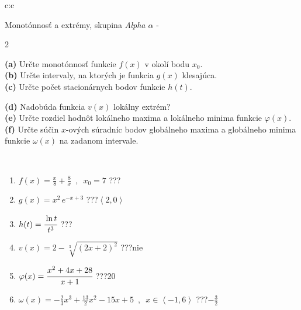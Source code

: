 \documentclass[10pt]{report}
\begin{document}
\thispagestyle{empty}
\begin{tabular}{c:c}
\begin{minipage}[c][104.5mm][t]{0.5\linewidth}
\begin{center}
\vspace{7mm}
{\huge Monotónnosť a extrémy, skupina \textit{Alpha $\alpha$} -}\\[5mm]
\begin{minipage}{0.95\linewidth}
\begin{center}
{\small \begin{multicols}{2} \raggedright
\textbf{(a)} Určte monotónnosť funkcie \(f(x)\) v okolí bodu \(x_0\). \\[1mm]
\textbf{(b)} Určte intervaly, na ktorých je funkcia \(g(x)\) klesajúca. \\[1mm]
\textbf{(c)} Určte počet stacionárnych bodov funkcie \(h(t)\). \par \columnbreak
\textbf{(d)} Nadobúda funkcia \(v(x)\) lokálny extrém? \\[1mm]
\textbf{(e)} Určte rozdiel hodnôt lokálneho maxima a lokálneho minima funkcie \(\varphi(x)\). \\[1mm]
\textbf{(f)} Určte súčin \(x\)-ových súradníc bodov globálneho maxima a globálneho minima funkcie \(\omega(x)\) na zadanom intervale. \\[1mm]
\end{multicols}
}
\end{center}
\end{minipage}
\\[4mm]
\begin{minipage}{0.79\linewidth}
\begin{center}
\begin{varwidth}{\linewidth}
\begin{enumerate}
\normalsize
\item $f(x)=\frac{x}{8}+\frac{8}{x} \enspace , \enspace x_0=7$\quad \dotfill\; ???\;\dotfill \quad {}
\item $g(x)=x^2\, e^{-x+3}$\quad \dotfill\; ???\;\dotfill \quad $\left\langle2 , 0\right\rangle$
\item $h(t)=\cfrac{\ln t}{t^3}$\quad \dotfill\; ???\;\dotfill {}
\item $v(x)=2-\sqrt[3]{(2x+2)^2}$\quad \dotfill\; ???\;\dotfill \quad $\text{nie}$
\item $\varphi(x)=\cfrac{x^2+4x+28}{x+1}$\quad \dotfill\; ???\;\dotfill \quad $20$
\item $\omega(x)=-\frac{2}{3}x^3+\frac{13}{2}x^2-15x+5 \enspace , \enspace x\in\left\langle-1 , 6\right\rangle$\quad \dotfill\; ???\;\dotfill \quad $-\frac{3}{2}$

\end{enumerate}
\end{varwidth}
\end{center}
\end{minipage}
\end{center}
\end{minipage}
\end{tabular}
\end{document}
